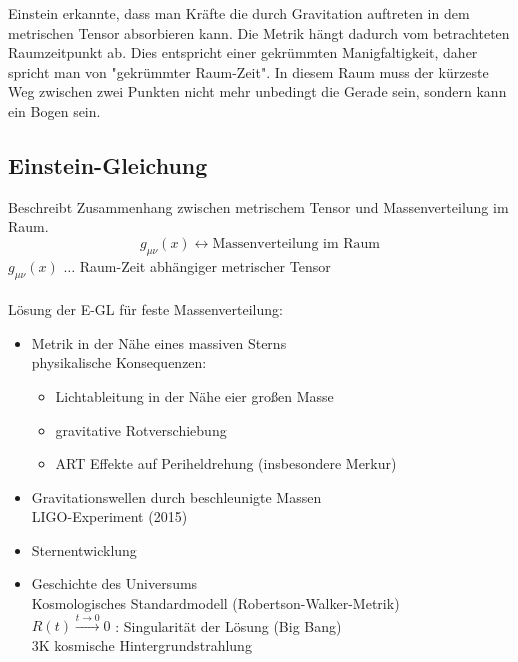 \documentclass[a4paper, 11pt]{article}
\begin{document}
Einstein erkannte, dass man Kräfte die durch Gravitation auftreten in dem metrischen Tensor absorbieren kann. Die Metrik hängt dadurch vom betrachteten Raumzeitpunkt ab. Dies entspricht einer gekrümmten Manigfaltigkeit, daher spricht man von "gekrümmter Raum-Zeit". In diesem Raum muss der kürzeste Weg zwischen zwei Punkten nicht mehr unbedingt die Gerade sein, sondern kann ein Bogen sein.

\subsection*{Einstein-Gleichung}
Beschreibt Zusammenhang zwischen metrischem Tensor und Massenverteilung im Raum.
\begin{equation*}
g_{\mu \nu}(x) \leftrightarrow \text{Massenverteilung im Raum}
\end{equation*}
$g_{\mu \nu}(x)$ $\dots$ Raum-Zeit abhängiger metrischer Tensor\\ \\
Lösung der E-GL für feste Massenverteilung:

\renewcommand{\labelitemi}{$\rightarrow$}
\begin{itemize}
\item Metrik in der Nähe eines massiven Sterns\\
physikalische Konsequenzen: 
\begin{itemize}
\item Lichtableitung in der Nähe eier großen Masse
\item gravitative Rotverschiebung
\item ART Effekte auf Periheldrehung (insbesondere Merkur) 
\end{itemize}

\item Gravitationswellen durch beschleunigte Massen \\
LIGO-Experiment (2015)
\item Sternentwicklung\\

\item Geschichte des Universums \\
Kosmologisches Standardmodell (Robertson-Walker-Metrik)\\
$R(t) \xrightarrow{t \rightarrow 0} 0$ : Singularität der Lösung (Big Bang)\\
3K kosmische Hintergrundstrahlung
\end{itemize}
\end{document}
